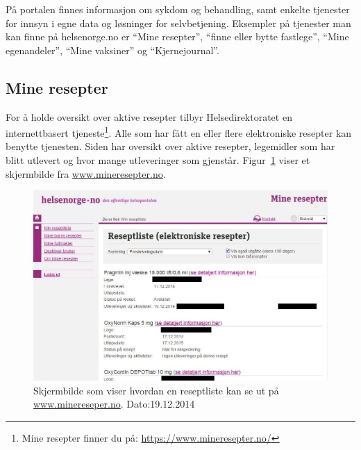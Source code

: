 På portalen finnes informasjon om sykdom og behandling, samt enkelte tjenester for innsyn i egne data og løsninger for selvbetjening. Eksempler på tjenester man kan finne på helsenorge.no er “Mine resepter”, “finne eller bytte fastlege”, “Mine egenandeler”, “Mine vaksiner” og “Kjernejournal”.

\subsection{Mine resepter}
For å holde oversikt over aktive resepter tilbyr Helsedirektoratet en internettbasert tjeneste\footnote{Mine resepter finner du på: \url{https://www.mineresepter.no/}}. Alle som har fått en eller flere elektroniske resepter kan benytte tjenesten. Siden har oversikt over aktive resepter, legemidler som har blitt utlevert og hvor mange utleveringer som gjenstår. Figur~\ref{fig:mineResepter} viser et skjermbilde fra \url{www.mineresepter.no}.

\begin{figure}[H]
  \centering
    \includegraphics[width=1\textwidth]{fig/dagens/mineresepter.jpg}
  \caption{Skjermbilde som viser hvordan en reseptliste kan se ut på \url{www.minereseper.no}. Dato:19.12.2014}
\label{fig:mineResepter}
\end{figure}

